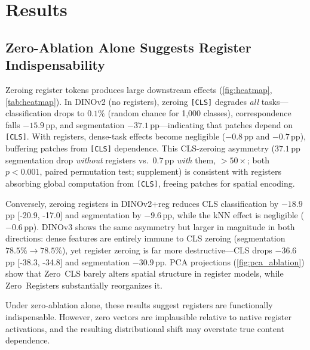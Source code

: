 \documentclass[10pt,twocolumn,letterpaper]{article}
\newcommand{\ci}[2]{{\scriptsize[#1, #2]}}
\begin{document}

\section{Results}
\label{sec:results}

\subsection{Zero-Ablation Alone Suggests Register Indispensability}
\label{sec:heatmap}

Zeroing register tokens produces large downstream effects (\cref{fig:heatmap}, \cref{tab:heatmap}).
In DINOv2 (no registers), zeroing \texttt{[CLS]} degrades \emph{all} tasks---classification drops to $0.1\%$ (random chance for 1{,}000 classes), correspondence falls $-15.9$\,pp, and
segmentation $-37.1$\,pp---indicating that patches depend on \texttt{[CLS]}.
With registers, dense-task effects become negligible ($-0.8$\,pp and $-0.7$\,pp), buffering patches from \texttt{[CLS]} dependence.
This CLS-zeroing asymmetry ($37.1$\,pp segmentation drop \emph{without}
registers vs.\ $0.7$\,pp \emph{with} them, ${>}50{\times}$; both
$p < 0.001$, paired permutation test; supplement) is consistent with registers absorbing global computation from \texttt{[CLS]}, freeing patches for spatial encoding.

Conversely, zeroing registers in DINOv2+reg reduces CLS classification by $-18.9$\,pp \ci{-20.9}{-17.0} and segmentation by $-9.6$\,pp, while the kNN effect is negligible ($-0.6$\,pp).
DINOv3 shows the same asymmetry but larger in magnitude in both directions: dense features are entirely immune to CLS zeroing
(segmentation $78.5\% \to 78.5\%$), yet register zeroing is far more
destructive---CLS drops $-36.6$\,pp \ci{-38.3}{-34.8} and
segmentation $-30.9$\,pp.
PCA projections (\cref{fig:pca_ablation}) show that Zero~CLS barely alters spatial structure in register models, while Zero~Registers substantially reorganizes it.

Under zero-ablation alone, these results suggest registers are functionally indispensable. However, zero vectors are implausible relative to native register activations, and the resulting distributional shift may overstate true content dependence.
\end{document}
